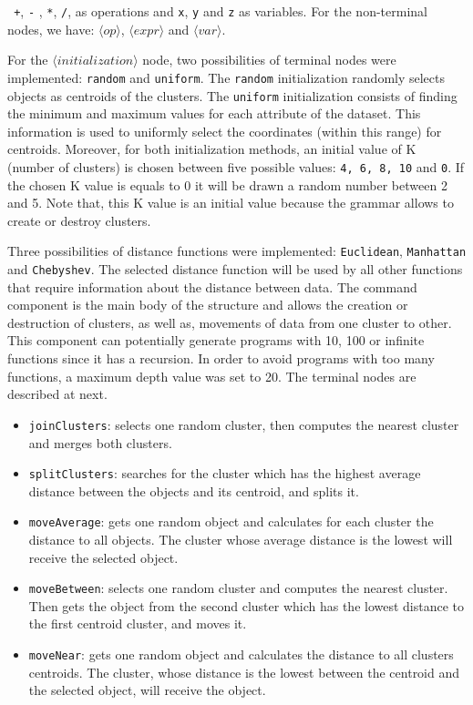 \documentclass[conference]{IEEEtran}
\begin{document}
	\texttt{ +}, \texttt{-} , \texttt{*}, \texttt{/},   as operations and \texttt{x}, \texttt{y} and  \texttt{z}   as variables. For the non-terminal nodes, we have:  $\langle op \rangle$, $\langle expr \rangle$  and $\langle var \rangle$. 
	
	
	For the $\langle initialization \rangle$ node, two possibilities of terminal nodes were implemented: \texttt{random} and \texttt{uniform}. The \texttt{random} initialization randomly selects  objects as centroids of the clusters. The \texttt{uniform} initialization consists of finding the minimum and maximum values for each attribute of the dataset. This information is used to uniformly select the coordinates (within this range) for centroids. Moreover, for both initialization methods, an initial value of K (number of clusters) is chosen between five possible values: \texttt{4, 6, 8, 10} and \texttt{0}. If the chosen K value is equals to 0 it will be drawn a random number between 2 and 5. Note that, this K value is an initial value because the grammar allows to create or destroy clusters. 
	
	
	Three possibilities of distance functions were implemented: \texttt{Euclidean}, \texttt{Manhattan} and \texttt{Chebyshev}. The selected distance function will be used by all other functions that require information about the distance between data. The command component is the main body of the structure and allows the creation or destruction of clusters, as well as, movements of data from one cluster to other. This component can potentially generate programs with 10, 100 or infinite functions since it has a recursion. In order to avoid programs with too many functions, a maximum depth value was set to 20. The terminal nodes are described at next.
	
	
	\begin{itemize}
		\item \texttt{joinClusters}:  selects one random cluster, then computes the nearest cluster and merges both clusters.
		\item \texttt{splitClusters}:  searches for the cluster which has the highest average distance between the objects and its centroid, and splits it. 
		\item \texttt{moveAverage}:   gets one random object and calculates for each cluster the distance to all objects. The cluster whose average distance is the lowest will receive the selected object.
		\item \texttt{moveBetween}:  selects one random cluster and computes the nearest cluster. Then gets the object from the second cluster which has the lowest distance to the first centroid cluster, and moves it.
		\item \texttt{moveNear}:   gets one random object and calculates the distance to all clusters centroids. The cluster, whose distance is the lowest between the centroid and the selected object, will receive the object.
	\end{itemize}
	
\end{document}

